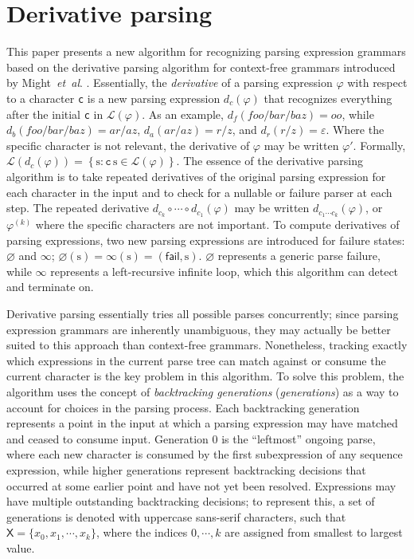 \documentclass[submission,copyright,creativecommons]{eptcs}
\newcommand{\fail}{\mathsf{fail}}
\newcommand{\Lang}{\mathcal{L}}
\newcommand{\str}{\mathrm{s}}
\newcommand{\chs}[1]{\mathtt{#1}}
\newcommand{\g}[1]{\mathsf{#1}}
\newcommand{\etal}{\textit{et~al}. }
\begin{document}
\section{Derivative parsing}
\label{algo-sec}
This paper presents a new algorithm for recognizing parsing expression grammars based on the derivative parsing algorithm for context-free grammars introduced by Might~\etal \cite{MDS11}. 
Essentially, the \emph{derivative} of a parsing expression $\varphi$ with respect to a character \texttt{c} is a new parsing expression $d_c(\varphi)$ that recognizes everything after the initial \texttt{c} in $\Lang(\varphi)$. 
As an example, $d_f\left(foo/bar/baz\right) = oo$, while $d_b\left(foo/bar/baz\right) = ar/az$, $d_a\left(ar/az\right) = r/z$, and $d_r\left(r/z\right) = \varepsilon$.
Where the specific character is not relevant, the derivative of $\varphi$ may be written $\varphi'$. 
Formally, $\Lang(d_c(\varphi)) = \left\lbrace \str : \chs{c}\,\str \in \Lang(\varphi) \right\rbrace$. 
The essence of the derivative parsing algorithm is to take repeated derivatives of the original parsing expression for each character in the input and to check for a nullable or failure parser at each step. 
The repeated derivative $d_{c_k} \circ \cdots \circ d_{c_1}(\varphi)$ may be written $d_{c_1 \cdots c_k}(\varphi)$, or $\varphi^{(k)}$ where the specific characters are not important.
To compute derivatives of parsing expressions, two new parsing expressions are introduced for failure states: $\varnothing$ and $\infty$; $\varnothing(\str) = \infty(\str) = \left(\fail, \str\right)$. 
$\varnothing$ represents a generic parse failure, while $\infty$ represents a left-recursive infinite loop, which this algorithm can detect and terminate on. 

Derivative parsing essentially tries all possible parses concurrently; since parsing expression grammars are inherently unambiguous, they may actually be better suited to this approach than context-free grammars. 
Nonetheless, tracking exactly which expressions in the current parse tree can match against or consume the current character is the key problem in this algorithm. 
To solve this problem, the algorithm uses the concept of \emph{backtracking generations} (\emph{generations}) as a way to account for choices in the parsing process. 
Each backtracking generation represents a point in the input at which a parsing expression may have matched and ceased to consume input.
Generation $0$ is the ``leftmost'' ongoing parse, where each new character is consumed by the first subexpression of any sequence expression, while higher generations represent backtracking decisions that occurred at some earlier point and have not yet been resolved.
Expressions may have multiple outstanding backtracking decisions; to represent this, a set of generations is denoted with uppercase sans-serif characters, such that $\g{X} = \{x_0, x_1, \cdots, x_k\}$, where the indices $0, \cdots, k$ are assigned from smallest to largest value.
\end{document}
